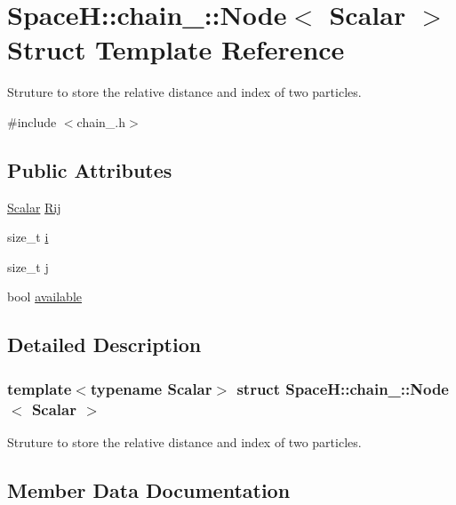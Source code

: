 \hypertarget{struct_space_h_1_1chain_1_1_node}{}\section{SpaceH\+:\+:chain_\+:\+:Node$<$ Scalar $>$ Struct Template Reference}
\label{struct_space_h_1_1chain_1_1_node}


Struture to store the relative distance and index of two particles.  




{\ttfamily \#include $<$chain_.\+h$>$}

\subsection*{Public Attributes}
\begin{DoxyCompactItemize}
\item 
\mbox{\hyperlink{create_kepler_8cpp_a8c2981f3f834be9448a6ab06c28748eb}{Scalar}} \mbox{\hyperlink{struct_space_h_1_1chain_1_1_node_aea525d23b6c16acd3e2c186d36327f92}{Rij}}
\item 
size\+\_\+t \mbox{\hyperlink{struct_space_h_1_1chain_1_1_node_ac3784f544e43740ba9496a821b1818eb}{i}}
\item 
size\+\_\+t \mbox{\hyperlink{struct_space_h_1_1chain_1_1_node_a7e0bcb5270769de3d49ee981241b027c}{j}}
\item 
bool \mbox{\hyperlink{struct_space_h_1_1chain_1_1_node_a98b17b286eb6c281f087224d348070f6}{available}}
\end{DoxyCompactItemize}


\subsection{Detailed Description}
\subsubsection*{template$<$typename Scalar$>$\newline
struct Space\+H\+::chain_\+::\+Node$<$ Scalar $>$}

Struture to store the relative distance and index of two particles. 

\subsection{Member Data Documentation}
\mbox{\label{struct_space_h_1_1chain_1_1_node_a98b17b286eb6c281f087224d348070f6}} 
